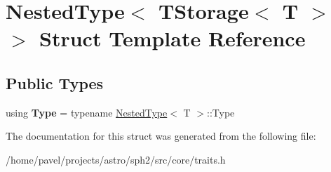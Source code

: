 \hypertarget{structNestedType_3_01TStorage_3_01T_01_4_01_4}{}\section{Nested\+Type$<$ T\+Storage$<$ T $>$ $>$ Struct Template Reference}
\label{structNestedType_3_01TStorage_3_01T_01_4_01_4}
\subsection*{Public Types}
\begin{DoxyCompactItemize}
\item 
\hypertarget{structNestedType_3_01TStorage_3_01T_01_4_01_4_a0e61555b2e9dffebf6c1bbcb728e225d}{}\label{structNestedType_3_01TStorage_3_01T_01_4_01_4_a0e61555b2e9dffebf6c1bbcb728e225d} 
using {\bfseries Type} = typename \hyperlink{structNestedType}{Nested\+Type}$<$ T $>$\+::Type
\end{DoxyCompactItemize}


The documentation for this struct was generated from the following file\+:\begin{DoxyCompactItemize}
\item 
/home/pavel/projects/astro/sph2/src/core/traits.\+h\end{DoxyCompactItemize}
